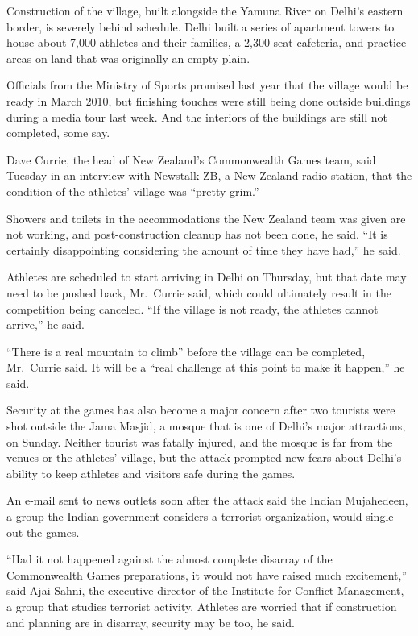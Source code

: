 ﻿\documentclass[12pt]{article}
\begin{document}
Construction of the village, built alongside the Yamuna River on Delhi's eastern border, is severely
behind schedule. Delhi built a series of apartment towers to house about 7,000 athletes and their
families, a 2,300-seat cafeteria, and practice areas on land that was originally an empty plain.

Officials from the Ministry of Sports promised last year that the village would be ready in March
2010, but finishing touches were still being done outside buildings during a media tour last week.
And the interiors of the buildings are still not completed, some say.

Dave Currie, the head of New Zealand's Commonwealth Games team, said Tuesday in an interview with
Newstalk ZB, a New Zealand radio station, that the condition of the athletes' village was ``pretty
grim.''

Showers and toilets in the accommodations the New Zealand team was given are not working, and
post-construction cleanup has not been done, he said. ``It is certainly disappointing considering
the amount of time they have had,'' he said.

Athletes are scheduled to start arriving in Delhi on Thursday, but that date may need to be pushed
back, Mr.~Currie said, which could ultimately result in the competition being canceled. ``If the
village is not ready, the athletes cannot arrive,'' he said.

``There is a real mountain to climb'' before the village can be completed, Mr.~Currie said. It will
be a ``real challenge at this point to make it happen,'' he said.

Security at the games has also become a major concern after two tourists were shot outside the Jama
Masjid, a mosque that is one of Delhi's major attractions, on Sunday. Neither tourist was fatally
injured, and the mosque is far from the venues or the athletes' village, but the attack prompted new
fears about Delhi's ability to keep athletes and visitors safe during the games.

An e-mail sent to news outlets soon after the attack said the Indian Mujahedeen, a group the Indian
government considers a terrorist organization, would single out the games.

``Had it not happened against the almost complete disarray of the Commonwealth Games preparations,
it would not have raised much excitement,'' said Ajai Sahni, the executive director of the Institute
for Conflict Management, a group that studies terrorist activity. Athletes are worried that if
construction and planning are in disarray, security may be too, he said.
\end{document}
